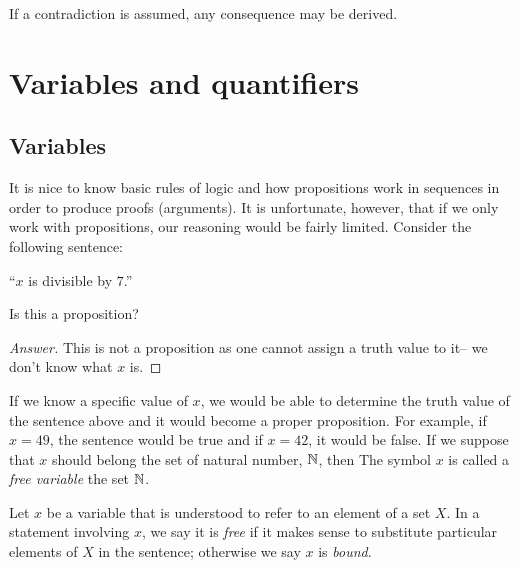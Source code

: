 \begin{axiom}
     If a contradiction is assumed, any consequence may be derived.  
\end{axiom}
 
 
\section{Variables and quantifiers}

\subsection{Variables}

It is nice to know basic rules of logic and how propositions work in sequences
in order to produce proofs (arguments).
It is unfortunate, however, that if we only work with propositions, our reasoning would 
be fairly limited.
Consider the following sentence:
\begin{center}
   ``$x$ is divisible by $7$.''
\end{center}

\begin{question}
    Is this a proposition?
\end{question}
\begin{proof}[Answer]
   This is not a proposition as one cannot assign a truth value to it-- 
   we don't know what $x$ is.
\end{proof}




If we know a specific value of $x$, we would be able to determine the truth value
of the sentence above and it would become a proper proposition. For example, if $x = 49$,
the sentence would be true and if $x = 42$, it would be false.
If we suppose that $x$ should belong the set of natural number, $\mathbb{N}$, 
then The symbol $x$ is called a \emph{free variable}
the set $\mathbb{N}$.

\begin{definition}
    Let $x$ be a variable that is understood to refer to an element of a set $X$. 
    In a statement involving $x$, we say it is \emph{free} if it makes sense to
    substitute particular elements of $X$ in the sentence; otherwise we
    say $x$ is \emph{bound}.
\end{definition}

